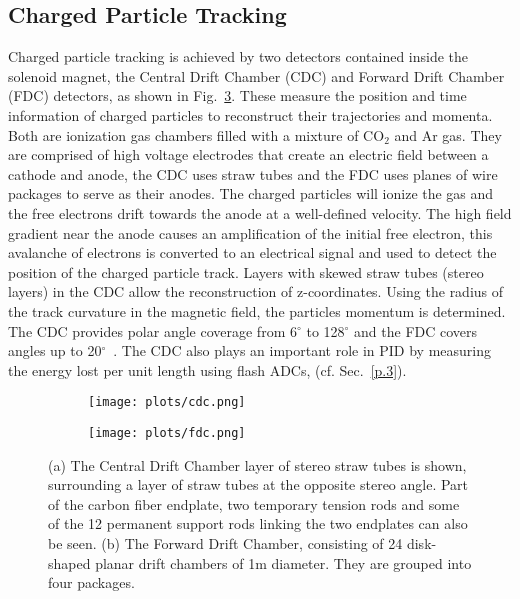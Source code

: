 {\subsection{Charged Particle Tracking}
\label{p.2.2.2}

Charged particle tracking is achieved by two detectors contained inside the solenoid magnet, the Central Drift Chamber (CDC) and Forward Drift Chamber (FDC) detectors, as shown in Fig.~\ref{fig.2.2.2}. These measure the position and time information of charged particles to reconstruct their trajectories and momenta. Both are ionization gas chambers filled with a mixture of CO$_2$ and Ar gas. They are comprised of high voltage electrodes that create an electric field between a cathode and anode, the CDC uses straw tubes and the FDC uses planes of wire packages to serve as their anodes. The charged particles will ionize the gas and the free electrons drift towards the anode at a well-defined velocity. The high field gradient near the anode causes an amplification of the initial free electron, this avalanche of electrons is converted to an electrical signal and used to detect the position of the charged particle track. Layers with skewed straw tubes (stereo layers) in the CDC allow the reconstruction of z-coordinates. Using the radius of the track curvature in the magnetic field, the particles momentum is determined. The CDC provides polar angle coverage from 6$^{\circ}$ to 128$^{\circ}$ and the FDC covers angles up to 20$^{\circ}$~\cite{GlueX97}. The CDC also plays an important role in PID by measuring the energy lost per unit length using flash ADCs, (cf. Sec.~\ref{p.3}).

\begin{figure}[H]
    \centering
    \begin{subfigure}[b]{0.7\textwidth}
        \texttt{[image: plots/cdc.png]}
        \caption{}
        \label{fig.2.2.2.a}
    \end{subfigure}
    \vfill
    \begin{subfigure}[b]{0.7\textwidth}
        \texttt{[image: plots/fdc.png]}
        \caption{}
        \label{fig.2.2.2.b}
    \end{subfigure}
    \caption{(a) The Central Drift Chamber layer of stereo straw tubes is shown, surrounding a layer of straw tubes at the opposite stereo angle. Part of the carbon fiber endplate, two temporary tension rods and some of the 12 permanent support rods linking the two endplates can also be seen. (b) The Forward Drift Chamber, consisting of 24 disk-shaped planar drift chambers of 1m diameter. They are grouped into four packages.}
    \label{fig.2.2.2}
\end{figure}

}
